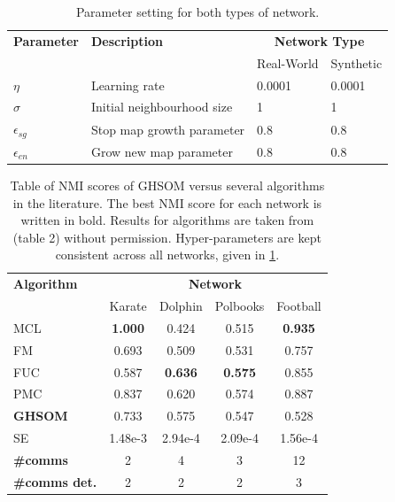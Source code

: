 \documentclass{report}
\begin{document}
	
	\begin{table}
		\centering
		\begin{tabular}{ l p{2.5cm} l l }
			\toprule
			\textbf{Parameter} & \textbf{Description} & \multicolumn{2}{c}{\textbf{Network Type}} \\
			{} & {} & Real-World & Synthetic \\ 
			\bottomrule
			$\eta$ & Learning rate & 0.0001 & 0.0001 \\ 
			$\sigma$ & Initial neighbourhood size & 1 & 1 \\
			$\epsilon_{sg}$ & Stop map growth parameter & 0.8 & 0.8 \\
			$\epsilon_{en}$ & Grow new map parameter & 0.8 & 0.8 \\
			\bottomrule
		\end{tabular}
		\caption{Parameter setting for both types of network.}
		\label{parametersettings}
	\end{table}
	
	
	\begin{table}
		\centering
		\begin{tabular}{ p{1.95cm} c c c c }
			\toprule
			\textbf{Algorithm} & \multicolumn{4}{c}{\textbf{Network}}\\
			{} & Karate & Dolphin & Polbooks & Football \\ 
			\bottomrule
			MCL & \textbf{1.000} & 0.424 & 0.515 & \textbf{0.935} \\ 
			FM & 0.693 & 0.509 & 0.531 & 0.757 \\ 
			FUC & 0.587 & \textbf{0.636} & \textbf{0.575} & 0.855 \\
			PMC & 0.837 & 0.620 & 0.574 & 0.887 \\ 
			\toprule
			\textbf{GHSOM} & 0.733 & 0.575 & 0.547 & 0.528 \\
			SE & 1.48e-3 & 2.94e-4 & 2.09e-4 & 1.56e-4 \\
			\bottomrule
			\textbf{\#comms} & 2 & 4 & 3 & 12 \\
			\textbf{\#comms det.} & 2 & 2 & 2 & 3 \\
			\bottomrule 
		\end{tabular}
		\caption{Table of NMI scores of GHSOM versus several algorithms in the literature. The best NMI score for each network is written in bold. Results for algorithms are taken from \protect\cite{yang2013hierarchical} (table 2) without permission. Hyper-parameters are kept consistent across all networks, given in \cref{parametersettings}.}
		\label{real_world_experiment}
	\end{table}
	
\end{document}
